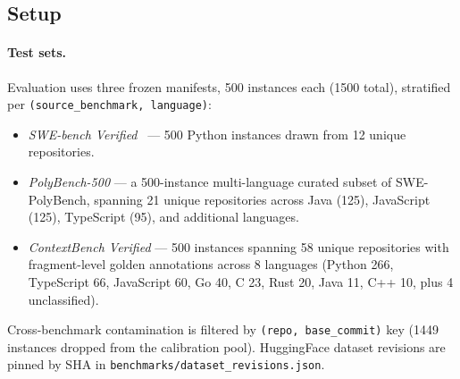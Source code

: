 \documentclass[11pt, a4paper]{article}
\begin{document}
\subsection{Setup}

\paragraph{Test sets.} Evaluation uses three frozen manifests, 500 instances each (1500 total), stratified per \texttt{(source\_benchmark, language)}:
\begin{itemize}
    \item \emph{SWE-bench Verified}~\cite{jimenez2024swebench} --- 500 Python instances drawn from 12 unique repositories.
    \item \emph{PolyBench-500} --- a 500-instance multi-language curated subset of SWE-PolyBench, spanning 21 unique repositories across Java (125), JavaScript (125), TypeScript (95), and additional languages.
    \item \emph{ContextBench Verified} --- 500 instances spanning 58 unique repositories with fragment-level golden annotations across 8 languages (Python 266, TypeScript 66, JavaScript 60, Go 40, C 23, Rust 20, Java 11, C++ 10, plus 4 unclassified).
\end{itemize}
Cross-benchmark contamination is filtered by \texttt{(repo, base\_commit)} key (1449 instances dropped from the calibration pool). HuggingFace dataset revisions are pinned by SHA in \texttt{benchmarks/dataset\_revisions.json}.
\end{document}
